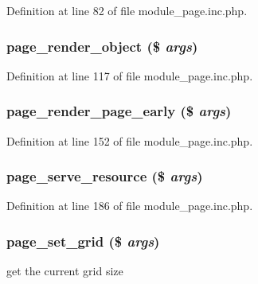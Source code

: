 Definition at line 82 of file module\_\-page.inc.php.

\hypertarget{module__page_8inc_8php_a53e7091b9a654d0d772cea6e3127820e}{
\subsubsection[{page\_\-render\_\-object}]{\setlength{\rightskip}{0pt plus 5cm}page\_\-render\_\-object (\$ {\em args})}}
\label{module__page_8inc_8php_a53e7091b9a654d0d772cea6e3127820e}


Definition at line 117 of file module\_\-page.inc.php.

\hypertarget{module__page_8inc_8php_a80aff2ea069c7a2ba120e26bb218efa5}{
\subsubsection[{page\_\-render\_\-page\_\-early}]{\setlength{\rightskip}{0pt plus 5cm}page\_\-render\_\-page\_\-early (\$ {\em args})}}
\label{module__page_8inc_8php_a80aff2ea069c7a2ba120e26bb218efa5}


Definition at line 152 of file module\_\-page.inc.php.

\hypertarget{module__page_8inc_8php_a4072227b7cf50c8d7bb6f49d85d95c39}{
\subsubsection[{page\_\-serve\_\-resource}]{\setlength{\rightskip}{0pt plus 5cm}page\_\-serve\_\-resource (\$ {\em args})}}
\label{module__page_8inc_8php_a4072227b7cf50c8d7bb6f49d85d95c39}


Definition at line 186 of file module\_\-page.inc.php.

\hypertarget{module__page_8inc_8php_aaadab51471c838ab9a0fa0c93a04b817}{
\subsubsection[{page\_\-set\_\-grid}]{\setlength{\rightskip}{0pt plus 5cm}page\_\-set\_\-grid (\$ {\em args})}}
\label{module__page_8inc_8php_aaadab51471c838ab9a0fa0c93a04b817}
get the current grid size


